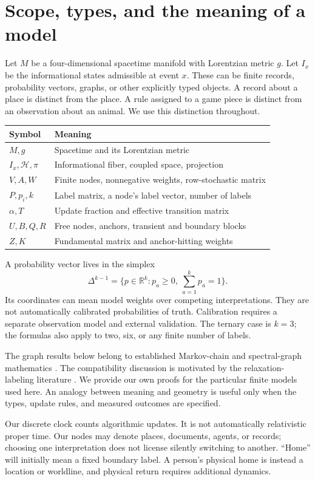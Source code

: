 \documentclass[12pt]{article}
\newcommand{\R}{\mathbb R}\newcommand{\one}{\mathbf1}\newcommand{\norm}[1]{\left\lVert#1\right\rVert}
\newcommand{\page}[1]{\section{#1}}
\begin{document}
\page{Scope, types, and the meaning of a model}
Let $M$ be a four-dimensional spacetime manifold with Lorentzian metric $g$. Let $I_x$ be the informational states admissible at event $x$. These can be finite records, probability vectors, graphs, or other explicitly typed objects. A record about a place is distinct from the place. A rule assigned to a game piece is distinct from an observation about an animal. We use this distinction throughout.
\begin{center}\begin{tabular}{ll}\toprule Symbol & Meaning\\\midrule $M,g$ & Spacetime and its Lorentzian metric\\ $I_x,\mathcal H,\pi$ & Informational fiber, coupled space, projection\\ $V,A,W$ & Finite nodes, nonnegative weights, row-stochastic matrix\\ $P,p_i,k$ & Label matrix, a node's label vector, number of labels\\ $\alpha,T$ & Update fraction and effective transition matrix\\ $U,B,Q,R$ & Free nodes, anchors, transient and boundary blocks\\ $Z,K$ & Fundamental matrix and anchor-hitting weights\\\bottomrule\end{tabular}\end{center}
A probability vector lives in the simplex
\begin{equation}\Delta^{k-1}=\{p\in\R^k:p_a\geq0,\ \sum_{a=1}^k p_a=1\}.\end{equation}
Its coordinates can mean model weights over competing interpretations. They are not automatically calibrated probabilities of truth. Calibration requires a separate observation model and external validation. The ternary case is $k=3$; the formulas also apply to two, six, or any finite number of labels.

The graph results below belong to established Markov-chain and spectral-graph mathematics \cite{levin,chung}. The compatibility discussion is motivated by the relaxation-labeling literature \cite{rosenfeld,hummel}. We provide our own proofs for the particular finite models used here. An analogy between meaning and geometry is useful only when the types, update rules, and measured outcomes are specified.

Our discrete clock counts algorithmic updates. It is not automatically relativistic proper time. Our nodes may denote places, documents, agents, or records; choosing one interpretation does not license silently switching to another. ``Home'' will initially mean a fixed boundary label. A person's physical home is instead a location or worldline, and physical return requires additional dynamics.
\end{document}
